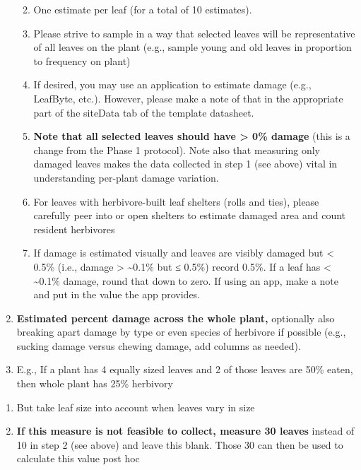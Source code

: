 \documentclass[
  letterpaper,
  DIV=11,
  numbers=noendperiod]{scrreprt}
\begin{document}
\begin{enumerate}
  \begin{enumerate}
  \def\labelenumii{\roman{enumii}.}
  \item
    One estimate per leaf (for a total of 10 estimates).
  \item
    Please strive to sample in a way that selected leaves will be
    representative of all leaves on the plant (e.g., sample young and
    old leaves in proportion to frequency on plant)
  \item
    If desired, you may use an application to estimate damage (e.g.,
    LeafByte, etc.). However, please make a note of that in the
    appropriate part of the siteData tab of the template datasheet.
  \item
    \textbf{Note that all selected leaves should have \textgreater{} 0\%
    damage} (this is a change from the Phase 1 protocol). Note also that
    measuring only damaged leaves makes the data collected in step 1
    (see above) vital in understanding per-plant damage variation.
  \item
    For leaves with herbivore-built leaf shelters (rolls and ties),
    please carefully peer into or open shelters to estimate damaged area
    and count resident herbivores
  \item
    If damage is estimated visually and leaves are visibly damaged but
    \textless{} 0.5\% (i.e., damage \textgreater{} \textasciitilde0.1\%
    but ≤ 0.5\%) record 0.5\%. If a leaf has \textless{}
    \textasciitilde0.1\% damage, round that down to zero. If using an
    app, make a note and put in the value the app provides.
  \end{enumerate}
\item
  \textbf{Estimated percent damage across the whole plant,} optionally
  also breaking apart damage by type or even species of herbivore if
  possible (e.g., sucking damage versus chewing damage, add columns as
  needed).
\item
  E.g., If a plant has 4 equally sized leaves and 2 of those leaves are
  50\% eaten, then whole plant has 25\% herbivory
\end{enumerate}

\begin{enumerate}
\def\labelenumi{\roman{enumi}.}
\setcounter{enumi}{1}
\item
  But take leaf size into account when leaves vary in size
\item
  \textbf{If this measure is not feasible to collect, measure 30 leaves}
  instead of 10 in step 2 (see above) and leave this blank. Those 30 can
  then be used to calculate this value post hoc
\end{enumerate}
\end{document}
